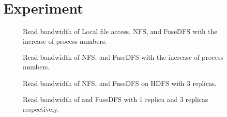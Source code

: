 \section{Experiment}
\label{sec:exp}

\begin{figure}[t]
\begin{minipage}{3in}
\begin{center}
\caption{\small Read bandwidth of Local file access, NFS, {\proj} and FuseDFS
with the increase of process numbers.}
\label{fig:read1}
\vspace{-6pt}
\end{center}
\end{minipage}
\hspace{0.02in}
\begin{minipage}{3in}
\begin{center}
\caption{\small Read bandwidth of NFS, {\proj} and FuseDFS
with the increase of process numbers.}
\label{fig:read2}
\vspace{-6pt}
\end{center}
\end{minipage}
\end{figure}

\begin{figure}[t]
\begin{minipage}{3in}
\begin{center}
\caption{\small Read bandwidth of NFS, {\proj} and FuseDFS on HDFS with 3
replicas.}
\label{fig:read3}
\vspace{-6pt}
\end{center}
\end{minipage}
\hspace{0.02in}
\begin{minipage}{3in}
\begin{center}
\caption{\small Read bandwidth of {\proj} and FuseDFS
with 1 replica and 3 replicas respectively.}
\label{fig:read4}
\vspace{-6pt}
\end{center}
\end{minipage}
\end{figure}


